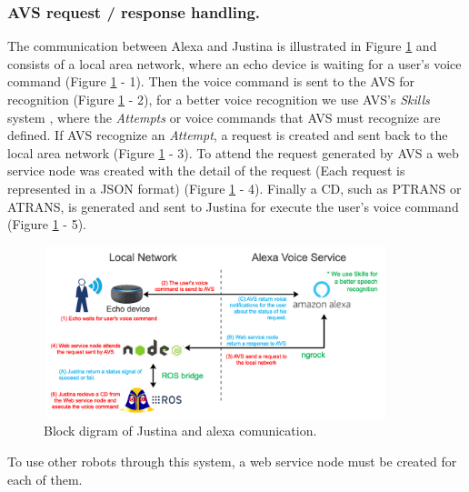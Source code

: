 \documentclass{llncs}
\begin{document}
\subsubsection{AVS request / response handling.}

The communication between Alexa and Justina is illustrated in Figure \ref{fig:alexaconexion} and 
consists of a local area network, 
where an echo device is waiting for a user's voice command (Figure \ref{fig:alexaconexion} - 1). 
Then the voice command is sent to the AVS for recognition (Figure \ref{fig:alexaconexion} - 2), 
for a better voice recognition we use AVS's \textit{Skills} system \cite{skills}, where the \textit{Attempts} or voice commands that AVS must recognize are defined.
If AVS recognize an \textit{Attempt}, 
a request is created and sent back to the local area network (Figure \ref{fig:alexaconexion} - 3). 
To attend the request generated by AVS a web service node was created with the detail of the request (Each request is represented in a JSON format) (Figure \ref{fig:alexaconexion} - 4). 
Finally a CD, such as PTRANS or ATRANS, is generated and sent to Justina for execute the user's voice command (Figure \ref{fig:alexaconexion} - 5).
\begin{figure}[h]
	\centering
	\includegraphics[angle=0, height=5cm, width=10cm]{Figures/alexa3.png}
	\caption{Block digram of Justina and alexa comunication.}
	\label{fig:alexaconexion}
\end{figure}

To use other robots through this system, a web service node must be created for each of them. 


\end{document}
